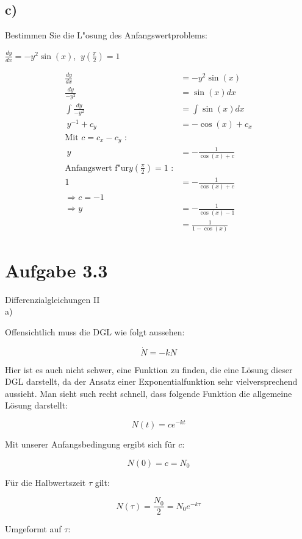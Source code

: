 \documentclass{theozettel}
\begin{document}
\subsection*{c)} Bestimmen Sie die L"osung des Anfangswertproblems:
\begin{center}
$\frac{dy}{dx} = -y^2 \sin\left(x\right)$,  $ \ y\left(\frac{\pi}{2}\right)=1$
\end{center}
\begin{align*}
\frac{dy}{dx} &= -y^2 \sin\left(x\right)\\
\frac{dy}{-y^2} &= \sin\left(x\right) dx\\
\int \frac{dy}{-y^2} &= \int \sin\left(x\right) dx\\
\ y^{-1} +c_y&= -\cos\left(x\right)+c_x\\
\text{Mit }c=c_x-c_y \text{ :}\\
\ y &= -\frac{1}{\cos\left(x\right)+c}\\
\text{Anfangswert f"ur}y\left(\frac{\pi}{2}\right)=1 \text{ :}\\
1&=-\frac{1}{\cos\left(x\right)+c}\\
\Rightarrow c=-1\\
\Rightarrow y&=-\frac{1}{\cos\left(x\right)-1}\\
&=\frac{1}{1-\cos\left(x\right)}
\end{align*}
\newpage
\section*{Aufgabe 3.3}Differenzialgleichungen II\\

a)

Offensichtlich muss die DGL wie folgt aussehen:

$$
\dot{N} = - k N
$$

Hier ist es auch nicht schwer, eine Funktion zu finden, die eine Lösung dieser DGL darstellt, da der Ansatz einer Exponentialfunktion sehr vielversprechend aussieht. Man sieht such recht schnell, dass folgende Funktion die allgemeine Lösung darstellt:

$$
N(t) = c e^{-k t}
$$

Mit unserer Anfangsbedingung ergibt sich für $c$:

$$
N(0) = c = N_0
$$

Für die Halbwertszeit $\tau$ gilt:

$$
N(\tau) = \frac{N_0}{2} = N_0 e^{-k \tau}
$$

Umgeformt auf $\tau$:
\end{document}
